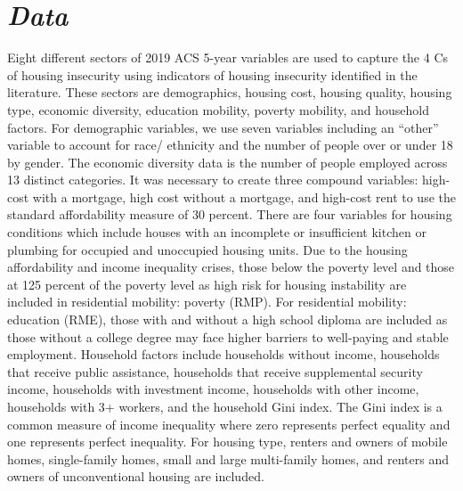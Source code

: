 \section{\textit{Data}}
Eight different sectors of 2019 ACS 5-year variables are used to capture the 4 Cs of housing insecurity using indicators of housing insecurity identified in the literature. These sectors are demographics, housing cost, housing quality, housing type, economic diversity, education mobility, poverty mobility, and household factors. For demographic variables, we use seven variables including an “other” variable to account for race/ ethnicity and the number of people over or under 18 by gender. The economic diversity data is the number of people employed across 13 distinct categories. It was necessary to create three compound variables: high-cost with a mortgage, high cost without a mortgage, and high-cost rent to use the standard affordability measure of 30 percent. There are four variables for housing conditions which include houses with an incomplete or insufficient kitchen or plumbing for occupied and unoccupied housing units.  Due to the housing affordability and income inequality crises, those below the poverty level and those at 125 percent of the poverty level as high risk for housing instability are included in residential mobility: poverty (RMP). For residential mobility: education (RME), those with and without a high school diploma are included as those without a college degree may face higher barriers to well-paying and stable employment. Household factors include households without income, households that receive public assistance, households that receive supplemental security income, households with investment income, households with other income, households with 3+ workers, and the household Gini index. The Gini index is a common measure of income inequality where zero represents perfect equality and one represents perfect inequality. For housing type, renters and owners of mobile homes, single-family homes, small and large multi-family homes, and renters and owners of unconventional housing are included.  

